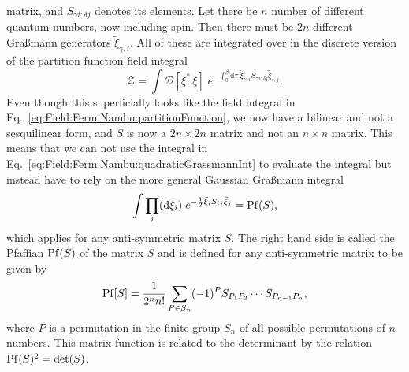 matrix, and $S_{\gamma i; \delta j}$ denotes its elements. Let there be $n$ number of different quantum numbers,
now including spin. Then there must be $2n$ different Gra\ss mann generators $\tilde{\xi}_{\gamma,i}$. All of these are integrated over in the discrete version
of the partition function field integral
\begin{equation}
    \label{eq:Field:Ferm:ExNambu:partitionFunction}
    \mathcal{Z} = \int\!\mathcal{D}[\xi^\ast\,\xi]\;e^{-\int_0^\beta\!\mathrm{d}\tau\;\tilde{\xi}_{\gamma,i}S_{\gamma i; \delta j}\tilde{\xi}_{\delta, j}}.
\end{equation}
Even though this superficially looks like the field integral in Eq.~\eqref{eq:Field:Ferm:Nambu:partitionFunction}, we now have a bilinear and not a sesquilinear
form, and $S$ is now a $2n\times2n$ matrix and not an $n\times n$ matrix. This means that we can not use the integral in Eq.~\eqref{eq:Field:Ferm:Nambu:quadraticGrassmannInt}
to evaluate the integral but instead have to rely on the more general Gaussian Gra\ss mann integral
\begin{equation}
    \label{eq:Field:Ferm:ExNambu:pfaffianIntegral}
    \int\prod_{i}(\mathrm{d}\tilde{\xi}_i)\;e^{-\frac{1}{2}\tilde{\xi}_iS_{ij}\tilde{\xi}_j} = \operatorname{Pf}(S),
\end{equation}
which applies for any anti-symmetric matrix $S$. The right hand side is called the Pfaffian $\operatorname{Pf}(S)$ of the matrix $S$ and is defined for any anti-symmetric
matrix to be given by
\begin{equation}
    \label{eq:Field:Ferm:ExNambu:pfaffianDef}
    \operatorname{Pf}[S] = \frac{1}{2^nn!}\sum_{P\in S_n}(-1)^PS_{P_1P_2}\cdots S_{P_{n-1}P_n},
\end{equation}
where $P$ is a permutation in the finite group $S_n$ of all possible permutations of $n$ numbers. This matrix function is related to the determinant
by the relation $\operatorname{Pf}(S)^2 = \det(S)$. 

